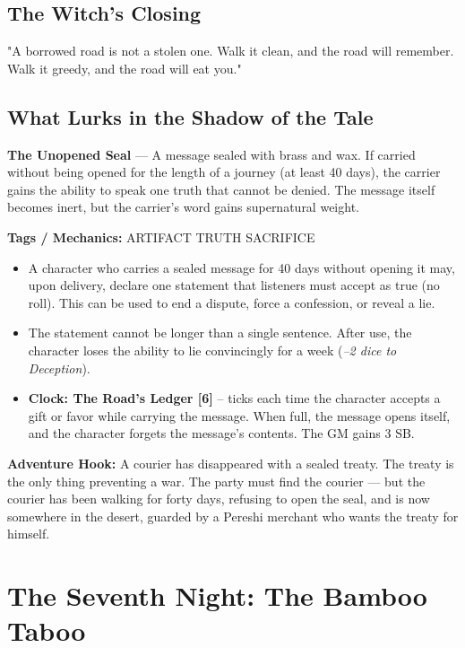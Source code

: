 \documentclass[10pt,twoside]{book}
\newcommand{\tag}[1]{\textsc{#1}}
\begin{document}
\section*{The Witch's Closing}
"A borrowed road is not a stolen one. Walk it clean, and the road will remember. Walk it greedy, and the road will eat you."

\section*{What Lurks in the Shadow of the Tale}
\begin{infobox}
\textbf{The Unopened Seal} --- A message sealed with brass and wax. If carried without being opened for the length of a journey (at least 40 days), the carrier gains the ability to speak one truth that cannot be denied. The message itself becomes inert, but the carrier's word gains supernatural weight.

\textbf{Tags / Mechanics:} \tag{ARTIFACT} \tag{TRUTH} \tag{SACRIFICE}

\begin{itemize}
\item A character who carries a sealed message for 40 days without opening it may, upon delivery, declare one statement that listeners must accept as true (no roll). This can be used to end a dispute, force a confession, or reveal a lie.
\item The statement cannot be longer than a single sentence. After use, the character loses the ability to lie convincingly for a week (\textit{--2 dice to Deception}).
\item \textbf{Clock: The Road's Ledger [6]} -- ticks each time the character accepts a gift or favor while carrying the message. When full, the message opens itself, and the character forgets the message's contents. The GM gains 3 SB.
\end{itemize}

\textbf{Adventure Hook:} A courier has disappeared with a sealed treaty. The treaty is the only thing preventing a war. The party must find the courier --- but the courier has been walking for forty days, refusing to open the seal, and is now somewhere in the desert, guarded by a Pereshi merchant who wants the treaty for himself.
\end{infobox}

\chapter{The Seventh Night: The Bamboo Taboo}
\end{document}
